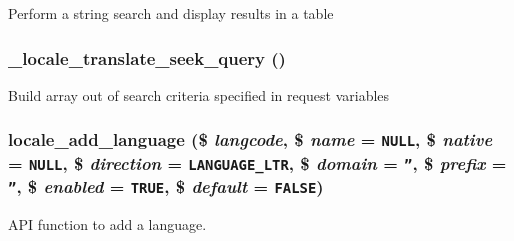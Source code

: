 Perform a string search and display results in a table \hypertarget{group__locale_g3afc18d03a7b2355e9328bc211acc4d1}{
\subsubsection[{\_\-locale\_\-translate\_\-seek\_\-query}]{\setlength{\rightskip}{0pt plus 5cm}\_\-locale\_\-translate\_\-seek\_\-query ()}}
\label{group__locale_g3afc18d03a7b2355e9328bc211acc4d1}


Build array out of search criteria specified in request variables \hypertarget{group__locale_g9fc28b9f10f5aaa7cb733dc0145018a2}{
\subsubsection[{locale\_\-add\_\-language}]{\setlength{\rightskip}{0pt plus 5cm}locale\_\-add\_\-language (\$ {\em langcode}, \/  \$ {\em name} = {\tt NULL}, \/  \$ {\em native} = {\tt NULL}, \/  \$ {\em direction} = {\tt {\bf LANGUAGE\_\-LTR}}, \/  \$ {\em domain} = {\tt ''}, \/  \$ {\em prefix} = {\tt ''}, \/  \$ {\em enabled} = {\tt TRUE}, \/  \$ {\em default} = {\tt FALSE})}}
\label{group__locale_g9fc28b9f10f5aaa7cb733dc0145018a2}


API function to add a language.

